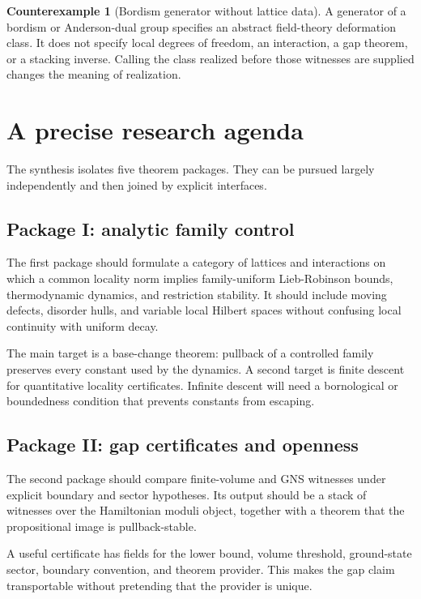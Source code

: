 \documentclass[12pt]{article}
\theoremstyle{definition}
\newtheorem{counterexample}[theorem]{Counterexample}
\theoremstyle{remark}
\begin{document}
\begin{counterexample}[Bordism generator without lattice data]
A generator of a bordism or Anderson-dual group specifies an abstract
field-theory deformation class.  It does not specify local degrees of
freedom, an interaction, a gap theorem, or a stacking inverse.  Calling the
class realized before those witnesses are supplied changes the meaning of
realization.
\end{counterexample}

\section{A precise research agenda}

The synthesis isolates five theorem packages.  They can be pursued largely
independently and then joined by explicit interfaces.

\subsection{Package I: analytic family control}

The first package should formulate a category of lattices and interactions
on which a common locality norm implies family-uniform Lieb-Robinson bounds,
thermodynamic dynamics, and restriction stability.  It should include
moving defects, disorder hulls, and variable local Hilbert spaces without
confusing local continuity with uniform decay.

The main target is a base-change theorem: pullback of a controlled family
preserves every constant used by the dynamics.  A second target is finite
descent for quantitative locality certificates.  Infinite descent will
need a bornological or boundedness condition that prevents constants from
escaping.

\subsection{Package II: gap certificates and openness}

The second package should compare finite-volume and GNS witnesses under
explicit boundary and sector hypotheses.  Its output should be a stack of
witnesses over the Hamiltonian moduli object, together with a theorem that
the propositional image is pullback-stable.

A useful certificate has fields for the lower bound, volume threshold,
ground-state sector, boundary convention, and theorem provider.  This makes
the gap claim transportable without pretending that the provider is unique.
\end{document}
